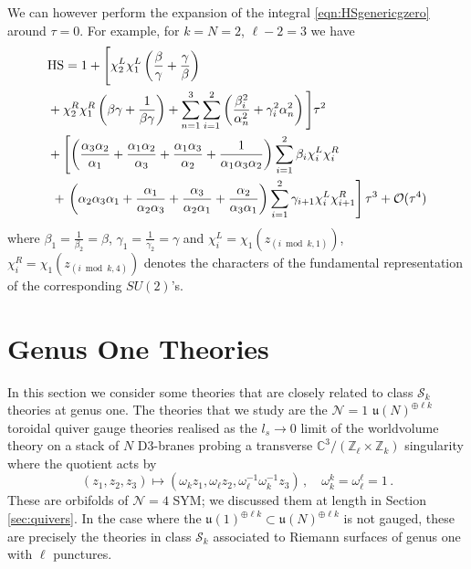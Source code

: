 \documentclass[main.tex]{subfiles}
\begin{document}
We can however perform the expansion of the integral \eqref{eqn:HSgenericgzero} around $\tau=0$. For example, for $k=N=2$, $\ell-2=3$ we have
\begin{equation}
\begin{aligned}
&\textrm{HS}=1+ \Bigg[\chi^L_{2} \chi^L_{1}\left(\frac{\beta }{\gamma }+\frac{\gamma }{\beta }\right)\\
& +\chi^R_{2}\chi^R_{1} \left(\beta  \gamma +\frac{1}{\beta  \gamma }\right)+\sum_{n=1}^{3}\sum_{i=1}^2\left(\frac{\beta^2_i}{\alpha _n^2}+\gamma_i^2\alpha _n^2\right)\Bigg]\tau^2\\
&+\left[\left(\frac{\alpha
   _3 \alpha _2}{\alpha _1}+\frac{\alpha _1 \alpha _2}{\alpha _3}+\frac{\alpha _1 \alpha _3}{\alpha _2}+\frac{1}{\alpha _1 \alpha _3 \alpha _2}\right) \sum_{i=1}^2\beta_i\chi_i^L\chi_i^R\right.\\
   &\,\,+\left.\left(\alpha _2 \alpha _3 \alpha _1+\frac{\alpha _1}{\alpha _2 \alpha _3}+\frac{\alpha _3}{\alpha _2 \alpha _1}+\frac{\alpha _2}{\alpha _3 \alpha _1}\right) \sum_{i=1}^2\gamma_{i+1}\chi^L_i\chi_{i+1}^R\right]\tau ^3 +\mathcal{O}(\tau^4)
   \end{aligned}
\end{equation}
where $\beta_1=\frac{1}{\beta_2}=\beta$, $\gamma_1=\frac{1}{\gamma_2}=\gamma$ and $\chi^L_{i}=\chi_{1}(z_{(i\bmod k,1)})$, $\chi^R_{i}=\chi_{1}(z_{(i\bmod k,4)})$ denotes the characters of the fundamental representation of the corresponding $SU(2)$'s.
\section{Genus One Theories}\label{sec:hsg1}
In this section we consider some theories that are closely related to class $\mathcal{S}_k$ theories at genus one. The theories that we study are the $\mathcal{N}=1$ $\mathfrak{u}(N)^{\oplus\ell k}$ toroidal quiver gauge theories realised as the $l_s\to0$ limit of the worldvolume theory on a stack of $N$ D3-branes probing a transverse $\mathbb{C}^3/(\mathbb{Z}_{\ell}\times\mathbb{Z}_k)$ singularity where the quotient acts by
\begin{equation}\label{eqn:quotientactZkZl}
(z_1,z_2,z_3)\mapsto(\omega_kz_1,\omega_{\ell}z_2,\omega_{\ell}^{-1}\omega^{-1}_{k}z_3)\,,\quad \omega_k^k=\omega_{\ell}^{\ell}=1\,.
\end{equation}
These are orbifolds of $\mathcal{N}=4$ SYM; we discussed them at length in Section \ref{sec:quivers}. In the case where the $\mathfrak{u}(1)^{\oplus\ell k}\subset\mathfrak{u}(N)^{\oplus\ell k}$ is not gauged, these are precisely the theories in class $\mathcal{S}_k$ associated to Riemann surfaces of genus one with $\ell$ punctures. 
\end{document}
